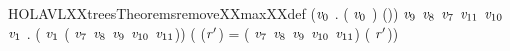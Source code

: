 \begin{SaveVerbatim}{HOLAVLXXtreesTheoremsremoveXXmaxXXdef}
\HOLTokenTurnstile{} (\HOLSymConst{\HOLTokenForall{}}\ensuremath{\HOLBoundVar{v}\sb{\mathrm{0}}}   .  ( \ensuremath{\HOLBoundVar{v}\sb{\mathrm{0}}}    ) \HOLSymConst{=} (\HOLSymConst{,}\HOLSymConst{,})) \HOLSymConst{\HOLTokenConj{}}
   \HOLSymConst{\HOLTokenForall{}}\ensuremath{\HOLBoundVar{v}\sb{\mathrm{9}}} \ensuremath{\HOLBoundVar{v}\sb{\mathrm{8}}} \ensuremath{\HOLBoundVar{v}\sb{\mathrm{7}}} \ensuremath{\HOLBoundVar{v}\sb{\mathrm{11}}} \ensuremath{\HOLBoundVar{v}\sb{\mathrm{10}}} \ensuremath{\HOLBoundVar{v}\sb{\mathrm{1}}}   .
      ( \ensuremath{\HOLBoundVar{v}\sb{\mathrm{1}}}    ( \ensuremath{\HOLBoundVar{v}\sb{\mathrm{7}}} \ensuremath{\HOLBoundVar{v}\sb{\mathrm{8}}} \ensuremath{\HOLBoundVar{v}\sb{\mathrm{9}}} \ensuremath{\HOLBoundVar{v}\sb{\mathrm{10}}} \ensuremath{\HOLBoundVar{v}\sb{\mathrm{11}}})) \HOLSymConst{=}
     (
        (\HOLSymConst{,}\HOLSymConst{,}\ensuremath{\HOLBoundVar{r}\sp{\prime{}}}) =  ( \ensuremath{\HOLBoundVar{v}\sb{\mathrm{7}}} \ensuremath{\HOLBoundVar{v}\sb{\mathrm{8}}} \ensuremath{\HOLBoundVar{v}\sb{\mathrm{9}}} \ensuremath{\HOLBoundVar{v}\sb{\mathrm{10}}} \ensuremath{\HOLBoundVar{v}\sb{\mathrm{11}}})
        (\HOLSymConst{,}\HOLSymConst{,}    \ensuremath{\HOLBoundVar{r}\sp{\prime{}}}))
\end{SaveVerbatim}
\newcommand{\HOLAVLXXtreesTheoremsremoveXXmaxXXdef}{\UseVerbatim{HOLAVLXXtreesTheoremsremoveXXmaxXXdef}}
